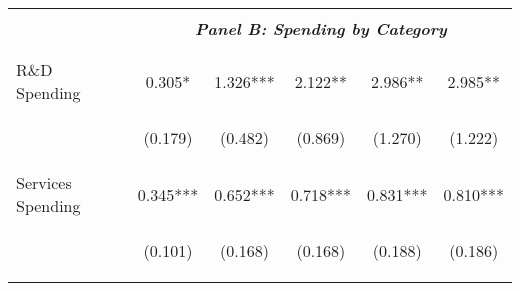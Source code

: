 \begin{tabular}{lccccc}
    \cmidrule{2-6}
    \vspace{-1.5pt} & \vspace{-1.5pt} & \vspace{-1.5pt} & \vspace{-1.5pt} & \vspace{-1.5pt} \\
    & \multicolumn{5}{c}{\textit{\textbf{Panel B: Spending by Category}}} \\ 
    \vspace{-1.5pt} & \vspace{-1.5pt} & \vspace{-1.5pt} & \vspace{-1.5pt} & \vspace{-1.5pt} \\ 
    \cmidrule{2-6}
    \vspace{-1.5pt} & \vspace{-1.5pt} & \vspace{-1.5pt} & \vspace{-1.5pt} & \vspace{-1.5pt} \\
    R\&D Spending & 0.305* & 1.326*** & 2.122** & 2.986** & 2.985** \\
    \vspace{4pt} & \begin{footnotesize}(0.179)\end{footnotesize} & \begin{footnotesize}(0.482)\end{footnotesize} & \begin{footnotesize}(0.869)\end{footnotesize} & \begin{footnotesize}(1.270)\end{footnotesize} & \begin{footnotesize}(1.222)\end{footnotesize} \\
    Services Spending & 0.345*** & 0.652*** & 0.718*** & 0.831*** & 0.810*** \\
    \vspace{4pt} & \begin{footnotesize}(0.101)\end{footnotesize} & \begin{footnotesize}(0.168)\end{footnotesize} & \begin{footnotesize}(0.168)\end{footnotesize} & \begin{footnotesize}(0.188)\end{footnotesize} & \begin{footnotesize}(0.186)\end{footnotesize} \\

\end{tabular}
